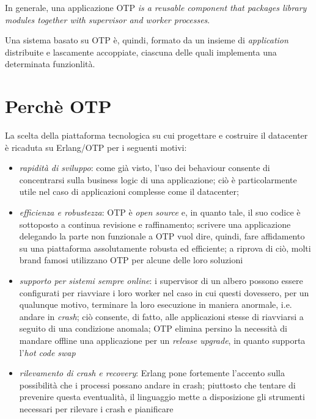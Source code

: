 %
In generale, una applicazione OTP \emph{is a reusable component that packages library modules 
together with supervisor and worker processes}\cite{cesarini09}.

%
Una sistema basato su OTP \`e, quindi, formato da un insieme di \emph{application} distribuite 
e lascamente accoppiate, ciascuna delle quali implementa una determinata funzionlit\`a.
%

%
\section{Perch\`e OTP}
%
La scelta della piattaforma tecnologica su cui progettare e costruire il datacenter \`e 
ricaduta su Erlang/OTP per i seguenti motivi:
%
\begin{itemize}
\item \emph{rapidit\`a di sviluppo}: come gi\`a visto, l'uso dei behaviour consente 
      di concentrarsi sulla business logic di una applicazione; ci\`o \`e particolarmente 
      utile nel caso di applicazioni complesse come il datacenter; 
%
\item \emph{efficienza e robustezza}: OTP \`e \emph{open source} e, in quanto tale, 
      il suo codice \`e sottoposto a continua revisione e raffinamento; scrivere 
      una applicazione delegando la parte non funzionale a OTP vuol dire, quindi, 
      fare affidamento su una piattaforma assolutamente robusta ed efficiente; 
      a riprova di ci\`o, molti brand famosi utilizzano OTP per alcune delle loro
      soluzioni\cite{whouseserlang}
%
\item \emph{supporto per sistemi sempre online}: i supervisor di un albero possono essere 
      configurati per riavviare i loro worker nel caso in cui questi dovessero, per 
      un qualunque motivo, terminare la loro esecuzione in maniera anormale, i.e. 
      andare in \emph{crash}; ci\`o consente, di fatto, alle applicazioni stesse di
      riavviarsi a seguito di una condizione anomala; OTP elimina persino la necessit\`a
      di mandare offline una applicazione per un \emph{release upgrade}, in quanto 
      supporta l'\emph{hot code swap}
%
\item \emph{rilevamento di crash e recovery}: Erlang pone fortemente l'accento sulla 
      possibilit\`a che i processi possano andare in crash; piuttosto che tentare 
      di prevenire questa eventualit\`a, il linguaggio mette a disposizione gli 
      strumenti necessari per  rilevare i crash e  pianificare 

\end{itemize}
